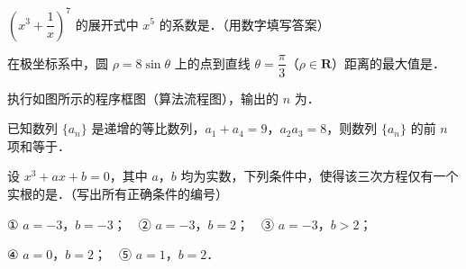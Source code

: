 \begin{question}
\(\left(x^3+\dfrac{1}{x}\right)^7\) 的展开式中 \(x^5\) 的系数是\gkblank{}．（用数字填写答案）

\end{question}
\begin{question}
在极坐标系中，圆 \(\rho=8\sin\theta\) 上的点到直线 \(\theta=\dfrac{\pi}{3}\)（\(\rho\in\mathbf{R}\)）距离的最大值是\gkblank{}．

\Needspace{0.4\textheight}
\end{question}
\begin{question}
执行如图所示的程序框图（算法流程图），输出的 \(n\) 为\gkblank{}．
\nopagebreak[4]
\begin{center}\end{center}
\nopagebreak[4]
\end{question}
\begin{question}
已知数列 \(\{a_n\}\) 是递增的等比数列，\(a_1+a_4=9\)，\(a_2a_3=8\)，则数列 \(\{a_n\}\) 的前 \(n\) 项和等于\gkblank{}．

\end{question}
\begin{question}
设 \(x^3+ax+b=0\)，其中 \(a\)，\(b\) 均为实数，下列条件中，使得该三次方程仅有一个实根的是\gkblank{}．（写出所有正确条件的编号）

① \(a=-3\)，\(b=-3\)；　② \(a=-3\)，\(b=2\)；　③ \(a=-3\)，\(b>2\)；

④ \(a=0\)，\(b=2\)；　⑤ \(a=1\)，\(b=2\)．

\end{question}

